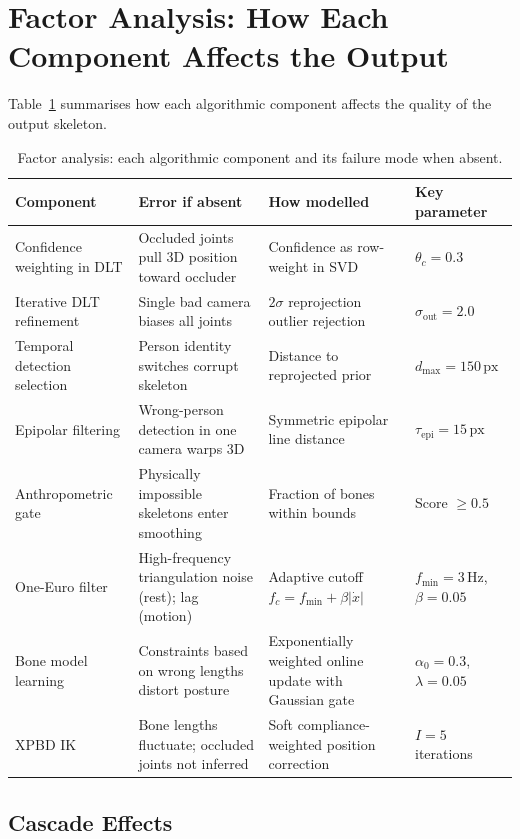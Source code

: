 \documentclass[11pt,a4paper]{article}
\begin{document}
\section{Factor Analysis: How Each Component Affects the Output}

Table~\ref{tab:factor_analysis} summarises how each algorithmic component affects
the quality of the output skeleton.

\begin{table}[ht]
\centering
\caption{Factor analysis: each algorithmic component and its failure mode when absent.}
\label{tab:factor_analysis}
\renewcommand{\arraystretch}{1.3}
\begin{tabular}{@{}p{3.5cm}p{3.5cm}p{3.5cm}p{3cm}@{}}
\toprule
\textbf{Component} & \textbf{Error if absent} & \textbf{How modelled} & \textbf{Key parameter} \\ \midrule
Confidence weighting in DLT & Occluded joints pull 3D position toward occluder & Confidence as row-weight in SVD & $\theta_c = 0.3$ \\
Iterative DLT refinement & Single bad camera biases all joints & $2\sigma$ reprojection outlier rejection & $\sigma_\text{out} = 2.0$ \\
Temporal detection selection & Person identity switches corrupt skeleton & Distance to reprojected prior & $d_\text{max} = 150\,\text{px}$ \\
Epipolar filtering & Wrong-person detection in one camera warps 3D & Symmetric epipolar line distance & $\tau_\text{epi} = 15\,\text{px}$ \\
Anthropometric gate & Physically impossible skeletons enter smoothing & Fraction of bones within bounds & Score $\geq 0.5$ \\
One-Euro filter & High-frequency triangulation noise (rest); lag (motion) & Adaptive cutoff $f_c = f_{\min} + \beta|\dot{x}|$ & $f_{\min} = 3\,\text{Hz}$, $\beta = 0.05$ \\
Bone model learning & Constraints based on wrong lengths distort posture & Exponentially weighted online update with Gaussian gate & $\alpha_0 = 0.3$, $\lambda = 0.05$ \\
XPBD IK & Bone lengths fluctuate; occluded joints not inferred & Soft compliance-weighted position correction & $I = 5$ iterations \\
\bottomrule
\end{tabular}
\end{table}

\subsection{Cascade Effects}
\end{document}
